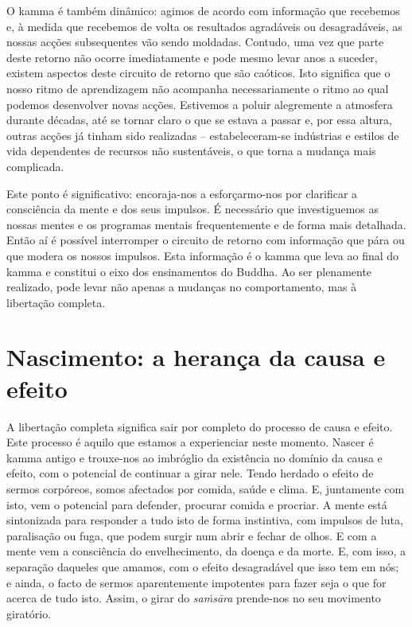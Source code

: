 O kamma é também dinâmico: agimos de acordo com informação que recebemos e, à
medida que recebemos de volta os resultados agradáveis ou desagradáveis, as
nossas acções subsequentes vão sendo moldadas. Contudo, uma vez que parte deste
retorno não ocorre imediatamente e pode mesmo levar anos a suceder, existem
aspectos deste circuito de retorno que são caóticos. Isto significa que o nosso
ritmo de aprendizagem não acompanha necessariamente o ritmo ao qual podemos
desenvolver novas acções. Estivemos a poluir alegremente a atmosfera durante
décadas, até se tornar claro o que se estava a passar e, por essa altura, outras
acções já tinham sido realizadas -- estabeleceram-se indústrias e estilos de
vida dependentes de recursos não sustentáveis, o que torna a mudança mais
complicada.

Este ponto é significativo: encoraja-nos a esforçarmo-nos por clarificar a
consciência da mente e dos seus impulsos. É necessário que investiguemos as
nossas mentes e os programas mentais frequentemente e de forma mais detalhada.
Então aí é possível interromper o circuito de retorno com informação que pára ou
que modera os nossos impulsos. Esta informação é o kamma que leva ao final do
kamma e constitui o eixo dos ensinamentos do Buddha.
Ao ser plenamente realizado, pode levar não apenas a mudanças no
comportamento, mas à libertação completa.

\section{Nascimento: a herança da causa e efeito}

A libertação completa significa sair por completo do processo de causa e efeito.
Este processo é aquilo que estamos a experienciar neste momento. Nascer é kamma
antigo e trouxe-nos ao imbróglio da existência no domínio da causa e efeito, com
o potencial de continuar a girar nele. Tendo herdado o efeito de sermos
corpóreos, somos afectados por comida, saúde e clima. E, juntamente com isto,
vem o potencial para defender, procurar comida e procriar. A mente está
sintonizada para responder a tudo isto de forma instintiva, com impulsos de
luta, paralisação ou fuga, que podem surgir num abrir e fechar de olhos. E com a
mente vem a consciência do envelhecimento, da doença e da morte. E, com isso, a
separação daqueles que amamos, com o efeito desagradável que isso tem em nós; e
ainda, o facto de sermos aparentemente impotentes para fazer seja o que for
acerca de tudo isto. Assim, o girar do \emph{saṁsāra} prende-nos no seu
movimento giratório.


